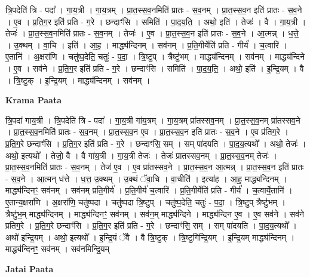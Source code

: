 \documentclass[17pt]{extarticle}
\begin{document}
त्रि॒पदेति॑ त्रि - पदा᳚ । गा॒य॒त्री । गा॒य॒त्रम् । प्रा॒त॒स्स॒व॒नमिति॑ प्रातः - स॒व॒नम् । प्रा॒त॒स्स॒व॒न इति॑ प्रातः - स॒व॒ने । ए॒व । प्र॒ति॒ग॒र इति॑ प्रति - ग॒रे । छन्दाꣳ॑सि । समिति॑ । पा॒द॒य॒ति॒ । अथो॒ इति॑ । तेजः॑ । वै । गा॒य॒त्री । तेजः॑ । प्रा॒त॒स्स॒व॒नमिति॑ प्रातः - स॒व॒नम् । तेजः॑ । ए॒व । प्रा॒त॒स्स॒व॒न इति॑ प्रातः - स॒व॒ने । आ॒त्मन्न् । ध॒त्ते॒ । उ॒क्थम् । वा॒चि । इति॑ । आ॒ह॒ । माद्ध्य॑न्दिनम् । सव॑नम् । प्र॒ति॒गीर्येति॑ प्रति - गीर्य॑ । च॒त्वारि॑ । ए॒तानि॑ । अ॒क्षरा॑णि । चतु॑ष्प॒देति॒ चतुः॑ - प॒दा॒ । त्रि॒ष्टुप् । त्रैष्टु॑भम् । माद्ध्य॑न्दिनम् । सव॑नम् । माद्ध्य॑न्दिने । ए॒व । सव॑ने । प्र॒ति॒ग॒र इति॑ प्रति - ग॒रे । छन्दाꣳ॑सि । समिति॑ । पा॒द॒य॒ति॒ । अथो॒ इति॑ । इ॒न्द्रि॒यम् । वै । त्रि॒ष्टुक् । इ॒न्द्रि॒यम् । माद्ध्य॑न्दिनम् । सव॑नम् ।  \newline


\textbf{Krama Paata} \newline

त्रि॒पदा॑ गाय॒त्री । त्रि॒पदेति॑ त्रि - पदा᳚ । गा॒य॒त्री गा॑य॒त्रम् । गा॒य॒त्रम् प्रा॑तस्सव॒नम् । प्रा॒त॒स्स॒व॒नम् प्रा॑तस्सव॒ने । प्रा॒त॒स्स॒व॒नमिति॑ प्रातः - स॒व॒नम् । प्रा॒त॒स्स॒व॒न ए॒व । प्रा॒त॒स्स॒व॒न इति॑ प्रातः - स॒व॒ने । ए॒व प्र॑तिग॒रे । प्र॒ति॒ग॒रे छन्दाꣳ॑सि । प्र॒ति॒ग॒र इति॑ प्रति - ग॒रे । छन्दाꣳ॑सि॒ सम् । सम् पा॑दयति । पा॒द॒य॒त्यथो᳚ । अथो॒ तेजः॑ । अथो॒ इत्यथो᳚ । तेजो॒ वै । वै गा॑य॒त्री । गा॒य॒त्री तेजः॑ । तेजः॑ प्रातस्सव॒नम् । प्रा॒त॒स्स॒व॒नम् तेजः॑ । प्रा॒त॒स्स॒व॒नमिति॑ प्रातः - स॒व॒नम् । तेज॑ ए॒व । ए॒व प्रा॑तस्सव॒ने । प्रा॒त॒स्स॒व॒न आ॒त्मन्न् । प्रा॒त॒स्स॒व॒न इति॑ प्रातः - स॒व॒ने । आ॒त्मन् ध॑त्ते । ध॒त्त॒ उ॒क्थम् । उ॒क्थं ॅवा॒चि । वा॒चीति॑ । इत्या॑ह । आ॒ह॒ माद्ध्य॑न्दिनम् । माद्ध्य॑न्दिनꣳ॒॒ सव॑नम् । सव॑नम् प्रति॒गीर्य॑ । प्र॒ति॒गीर्य॑ च॒त्वारि॑ । प्र॒ति॒गीर्येति॑ प्रति - गीर्य॑ । च॒त्वार्ये॒तानि॑ । ए॒तान्य॒क्षरा॑णि । अ॒क्षरा॑णि॒ चतु॑ष्पदा । चतु॑ष्पदा त्रि॒ष्टुप् । चतु॑ष्प॒देति॒ चतुः॑ - प॒दा॒ । त्रि॒ष्टुप् त्रैष्टु॑भम् । त्रैष्टु॑भ॒म् माद्ध्य॑न्दिनम् । माद्ध्य॑न्दिनꣳ॒॒ सव॑नम् । सव॑न॒म् माद्ध्य॑न्दिने । माद्ध्य॑न्दिन ए॒व । ए॒व सव॑ने । सव॑ने प्रतिग॒रे । प्र॒ति॒ग॒रे छन्दाꣳ॑सि । प्र॒ति॒ग॒र इति॑ प्रति - ग॒रे । छन्दाꣳ॑सि॒ सम् । सम् पा॑दयति । पा॒द॒य॒त्यथो᳚ । अथो॑ इन्द्रि॒यम् । अथो॒ इत्यथो᳚ । इ॒न्द्रि॒यं ॅवै । वै त्रि॒ष्टुक् । त्रि॒ष्टुगि॑न्द्रि॒यम् । इ॒न्द्रि॒यम् माद्ध्य॑न्दिनम् । माद्ध्य॑न्दिनꣳ॒॒ सव॑नम् । सव॑नमिन्द्रि॒यम् \newline

\textbf{Jatai Paata} \newline
\end{document}
